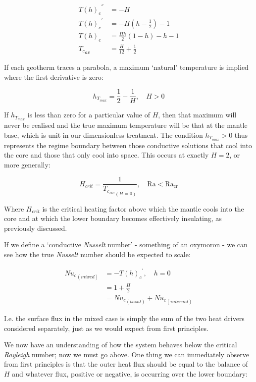\begin{align*}
{{T(h)}_{c}}^{''} &= -H \\
{{T(h)}_{c}}^{'} &= -H \left( h - \frac{1}{2} \right) - 1 \\
{T(h)}_{c} &= \frac{Hh}{2} \left( 1 - h \right) - h - 1 \\
{{T}_{c}}_{av} &= \frac{H}{12} + \frac{1}{2}
\end{align*}

If each geotherm traces a parabola, a maximum `natural' temperature is implied where the first derivative is zero:

\begin{equation}
h_{T_{max}} = \frac{1}{2} - \frac{1}{H}, \quad H > 0
\end{equation}

If $h_{T_{max}}$ is less than zero for a particular value of $H$, then that maximum will never be realised and the true maximum temperature will be that at the mantle base, which is unit in our dimensionless treatment. The condition $h_{T_{max}} > 0$ thus represents the regime boundary between those conductive solutions that cool into the core and those that only cool into space. This occurs at exactly $H = 2$, or more generally:

\begin{equation}
H_{crit} = \frac{1}{{{T_{c}}_{av}}_{(H=0)}}, \quad \mathrm{Ra} < {\mathrm{Ra}}_{\mathrm{cr}}
\end{equation}

Where $H_{crit}$ is the critical heating factor above which the mantle cools into the core and at which the lower boundary becomes effectively insulating, as previously discussed.

If we define a `conductive \textit{Nusselt} number' - something of an oxymoron - we can see how the true \textit{Nusselt} number should be expected to scale:

\begin{align*}
{{Nu}_{c}}_{(mixed)} &= -{{T(h)}_{c}}^{'}, \quad h = 0 \\
&= 1 + \frac{H}{2} \\
&= {{Nu}_{c}}_{(basal)} + {{Nu}_{c}}_{(internal)}
\end{align*}

I.e. the surface flux in the mixed case is simply the sum of the two heat drivers considered separately, just as we would expect from first principles.

We now have an understanding of how the system behaves below the critical \textit{Rayleigh} number; now we must go above. One thing we can immediately observe from first principles is that the outer heat flux should be equal to the balance of $H$ and whatever flux, positive or negative, is occurring over the lower boundary:

